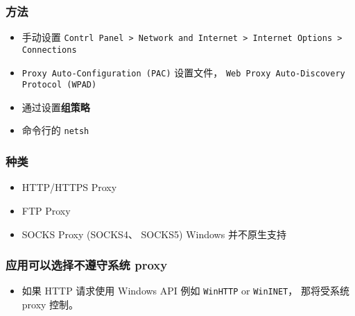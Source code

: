 
\subsubsection{方法}
\begin{itemize}
\item 手动设置 \verb`Contrl Panel > Network and Internet > Internet Options > Connections`
\item \verb`Proxy Auto-Configuration (PAC)` 设置文件， \verb`Web Proxy Auto-Discovery Protocol (WPAD)`
\item 通过设置\textbf{组策略}
\item 命令行的 \verb`netsh`
\end{itemize}

\subsubsection{种类}
\begin{itemize}
\item HTTP/HTTPS Proxy
\item FTP Proxy
\item SOCKS Proxy (SOCKS4、 SOCKS5) Windows 并不原生支持
\end{itemize}

\subsubsection{应用可以选择不遵守系统 proxy}
\begin{itemize}
\item 如果 HTTP 请求使用 Windows API 例如 \verb`WinHTTP` or \verb`WinINET`， 那将受系统 proxy 控制。
\end{itemize}
